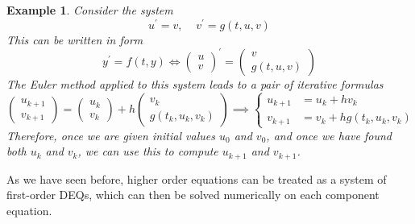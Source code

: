 \documentclass{article}
\newtheorem{example}{Example}[section]
\theoremstyle{remark}
\theoremstyle{definition}
\begin{document}
\begin{example}
Consider the system 
\[u^\prime = v, \;\;\;\; v^\prime = g(t, u, v)\]
This can be written in form 
\[y^\prime = f(t, y) \iff \begin{pmatrix} u \\ v \end{pmatrix}^\prime = \begin{pmatrix} v \\ g(t, u, v) \end{pmatrix} \]
The Euler method applied to this system leads to a pair of iterative formulas 
\[\begin{pmatrix} u_{k+1} \\ v_{k+1} \end{pmatrix} = \begin{pmatrix} u_k \\ v_k \end{pmatrix} + h \begin{pmatrix} v_k \\ g(t_k, u_k, v_k) \end{pmatrix} \implies \begin{cases} u_{k+1} & = u_k + h v_k \\
v_{k+1} & = v_k + h g(t_k, u_k, v_k) \end{cases}\]
Therefore, once we are given initial values $u_0$ and $v_0$, and once we have found both $u_k$ and $v_k$, we can use this to compute $u_{k+1}$ and $v_{k+1}$. 
\end{example}

As we have seen before, higher order equations can be treated as a system of first-order DEQs, which can then be solved numerically on each component equation. 
\end{document}
